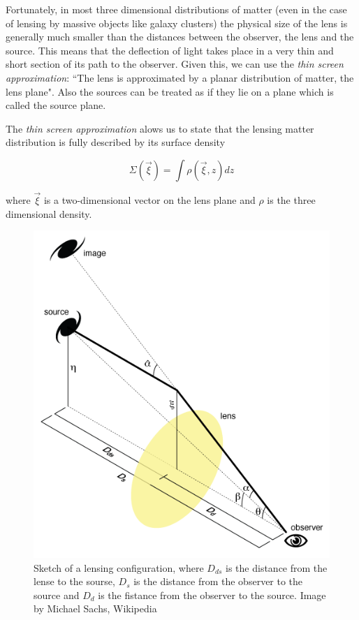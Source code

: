 Fortunately, in most three dimensional distributions of matter (even in the case of lensing by massive objects like galaxy clusters) the physical size of the lens is generally much smaller than the distances between the observer, the lens and the source. This means that the deflection of light takes place in a very thin and short section of its path to the observer. Given this, we can use the \textit{thin screen approximation}: ``The lens is approximated by a planar distribution of matter, the lens plane". Also the sources can be treated as if they lie on a plane which is called the source plane.

The \textit{thin screen approximation} alows us to state that the lensing matter distribution is fully described by its surface density

\begin{equation}
\Sigma(\vec{\xi}) = \int \rho (\vec{\xi},z)dz
\end{equation}

where $\vec{\xi}$ is a two-dimensional vector on the lens plane and $\rho$ is the three dimensional density.

\begin{figure}[H]
\centering
\includegraphics[width=12cm]{images/lensing.png}
\caption[Angles in gravitational lensing]{Sketch of a lensing configuration, where $D_{ds}$ is the distance from the lense to the sourse, $D_s$ is the distance from the observer to the source and $D_d$ is the fistance from the observer to the source. Image by Michael Sachs, Wikipedia}
\end{figure}


